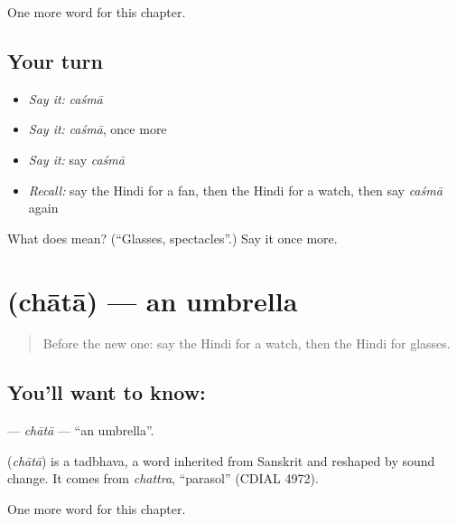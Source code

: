 \begin{grammarlens}[title={What you've built}]
One more word for this chapter.
\end{grammarlens}

\subsection*{Your turn}
\begin{itemize}
\raggedright
  \item \emph{Say it:} \emph{caśmā}
  \item \emph{Say it:} \emph{caśmā}, once more
  \item \emph{Say it:} say \emph{caśmā}
  \item \emph{Recall:} say the Hindi for a fan, then the Hindi for a watch, then say \emph{caśmā} again
\end{itemize}

\begin{tcolorbox}[breakable,colback=teal!4,colframe=teal!35!black,title={Before you move on}]
What does  mean? (\textquotedblleft{}Glasses, spectacles\textquotedblright{}.) Say it once more.
\end{tcolorbox}
\section[\texorpdfstring{\hi{छाता} (chātā)}{छाता (chātā)}]{ (chātā) — an umbrella}

\label{lesson:HI-C133-chata}



\begin{quote}
Before the new one: say the Hindi for a watch, then the Hindi for glasses.
\end{quote}

\subsection*{You'll want to know: }
\textbf{} — \emph{chātā} — \textquotedblleft{}an umbrella\textquotedblright{}.

\begin{cousinweb}
\textbf{} (\emph{chātā}) is a tadbhava, a word inherited from Sanskrit and reshaped by sound change. It comes from \emph{chattra}, \textquotedblleft{}parasol\textquotedblright{} (CDIAL 4972).
\end{cousinweb}

\begin{grammarlens}[title={What you've built}]
One more word for this chapter.
\end{grammarlens}

